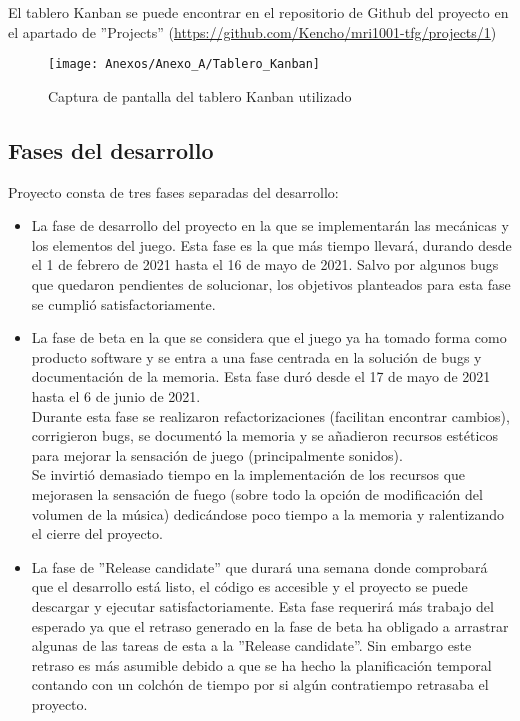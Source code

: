 El tablero Kanban se puede encontrar en el repositorio de Github del proyecto en el apartado de ''Projects'' (\url{https://github.com/Kencho/mri1001-tfg/projects/1})

\begin{figure}[h]
\centering
\texttt{[image: Anexos/Anexo\_A/Tablero\_Kanban]}
\caption{Captura de pantalla del tablero Kanban utilizado}
\end{figure}
\clearpage

\subsection{Fases del desarrollo}
Proyecto consta de tres fases separadas del desarrollo:
\begin{itemize}
\item
La fase de desarrollo del proyecto en la que se implementarán las mecánicas y los elementos del juego. Esta fase es la que más tiempo llevará, durando desde el 1 de febrero de 2021 hasta el 16 de mayo de 2021. Salvo por algunos bugs que quedaron pendientes de solucionar, los objetivos planteados para esta fase se cumplió satisfactoriamente.
\item
La fase de beta en la que se considera que el juego ya ha tomado forma como producto software y se entra a una fase centrada en la solución de bugs y documentación de la memoria. Esta fase duró desde el 17 de mayo de 2021 hasta el 6 de junio de 2021.\\
Durante esta fase se realizaron refactorizaciones (facilitan encontrar cambios), corrigieron bugs, se documentó la memoria y se añadieron recursos estéticos para mejorar la sensación de juego (principalmente sonidos).\\
Se invirtió demasiado tiempo en la implementación de los recursos que mejorasen la sensación de fuego (sobre todo la opción de modificación del volumen de la música) dedicándose poco tiempo a la memoria y ralentizando el cierre del proyecto.
\item
La fase de ''Release candidate'' que durará una semana donde comprobará que el desarrollo está listo, el código es accesible y el proyecto se puede descargar y ejecutar satisfactoriamente. Esta fase requerirá más trabajo del esperado ya que el retraso generado en la fase de beta ha obligado a arrastrar algunas de las tareas de esta a la ''Release candidate''. Sin embargo este retraso es más asumible debido a que se ha hecho la planificación temporal contando con un colchón de tiempo por si algún contratiempo retrasaba el proyecto.
\end{itemize}

